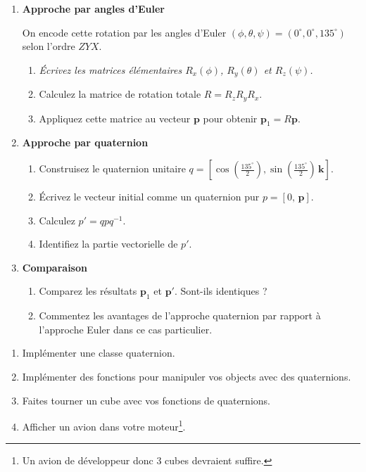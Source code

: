 \documentclass[a4paper,12pt]{article}
\begin{document}
\begin{enumerate}
    \item \textbf{Approche par angles d’Euler}

          On encode cette rotation par les angles d’Euler $(\phi, \theta, \psi) = (0^\circ, 0^\circ, 135^\circ)$ selon l’ordre $ZYX$.
          \begin{enumerate}
              \item \emph{Écrivez les matrices élémentaires $R_x(\phi)$, $R_y(\theta)$ et $R_z(\psi)$.}
              \item Calculez la matrice de rotation totale $R = R_z R_y R_x$.
              \item Appliquez cette matrice au vecteur $\mathbf{p}$ pour obtenir $\mathbf{p}_1 = R \mathbf{p}$.
          \end{enumerate}

    \item \textbf{Approche par quaternion}
          \begin{enumerate}
              \item Construisez le quaternion unitaire $q = \left[\cos\left(\frac{135^\circ}{2}\right), \sin\left(\frac{135^\circ}{2}\right)\,\mathbf{k}\right]$.
              \item Écrivez le vecteur initial comme un quaternion pur $p = [0,\,\mathbf{p}]$.
              \item Calculez $p' = q p q^{-1}$.
              \item Identifiez la partie vectorielle de $p'$.
          \end{enumerate}

    \item \textbf{Comparaison}
          \begin{enumerate}
              \item Comparez les résultats $\mathbf{p}_1$ et $\mathbf{p}'$. Sont-ils identiques ?
              \item Commentez les avantages de l’approche quaternion par rapport à l’approche Euler dans ce cas particulier.
          \end{enumerate}
\end{enumerate}


\begin{enumerate}
    \item Implémenter une classe quaternion.
    \item Implémenter des fonctions pour manipuler vos objects avec des quaternions.
    \item Faites tourner un cube avec vos fonctions de quaternions.
    \item Afficher un avion dans votre moteur\footnote{Un avion de développeur donc 3 cubes devraient suffire.}.
\end{enumerate}
\end{document}
